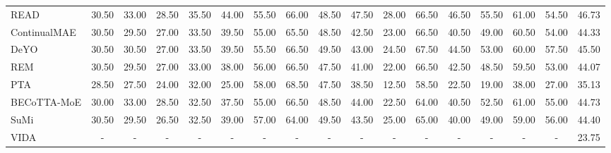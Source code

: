\begin{table}[p]
{\begin{tabular}{lcccccccccccccccc}
READ & 30.50 & 33.00 & 28.50 & 35.50 & 44.00 & 55.50 & 66.00 & 48.50 & 47.50 & 28.00 & 66.50 & 46.50 & 55.50 & 61.00 & 54.50 & 46.73 \\
ContinualMAE & 30.50 & 29.50 & 27.00 & 33.50 & 39.50 & 55.00 & 65.50 & 48.50 & 42.50 & 23.00 & 66.50 & 40.50 & 49.00 & 60.50 & 54.00 & 44.33 \\
DeYO & 30.50 & 30.50 & 27.00 & 33.50 & 39.50 & 55.50 & 66.50 & 49.50 & 43.00 & 24.50 & 67.50 & 44.50 & 53.00 & 60.00 & 57.50 & 45.50 \\
REM & 30.50 & 29.50 & 27.00 & 33.00 & 38.00 & 56.00 & 66.50 & 47.50 & 41.00 & 22.00 & 66.50 & 42.50 & 48.50 & 59.50 & 53.00 & 44.07 \\
PTA & 28.50 & 27.50 & 24.00 & 32.00 & 25.00 & 58.00 & 68.50 & 47.50 & 38.50 & 12.50 & 58.50 & 22.50 & 19.00 & 38.00 & 27.00 & 35.13 \\
BECoTTA-MoE & 30.00 & 33.00 & 28.50 & 32.50 & 37.50 & 55.00 & 66.50 & 48.50 & 44.00 & 22.50 & 64.00 & 40.50 & 52.50 & 61.00 & 55.00 & 44.73 \\
SuMi & 30.50 & 29.50 & 26.50 & 32.50 & 39.00 & 57.00 & 64.00 & 49.50 & 43.50 & 25.00 & 65.00 & 40.00 & 49.00 & 59.00 & 56.00 & 44.40 \\
VIDA & - & - & - & - & - & - & - & - & - & - & - & - & - & - & - & 23.75 \\
\bottomrule
\end{tabular}%
}
\end{table}

